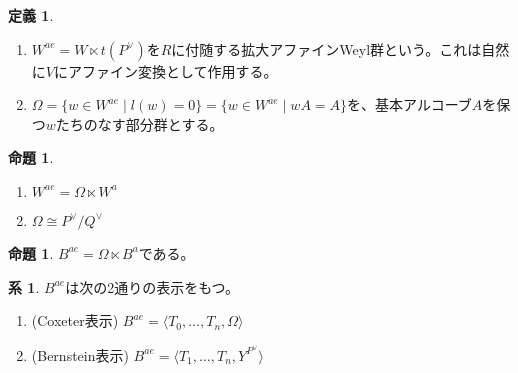 \documentclass[uplatex, a4paper, dvipdfmx]{jsarticle}
\theoremstyle{definition}
\newtheorem{definition}[theorem]{定義}
\newtheorem{proposition}[theorem]{命題}
\newtheorem{corollary}[theorem]{系}
\begin{document}
\begin{definition}
    \begin{enumerate}
        \item  $W^{ae} = W \ltimes t(P^\vee)$を$R$に付随する拡大アファインWeyl群という。これは自然に$V$にアファイン変換として作用する。
        \item $\Omega = \{w \in W^{ae} \mid l(w) = 0\} = \{w \in W^{ae} \mid wA = A\}$を、基本アルコーブ$A$を保つ$w$たちのなす部分群とする。
    \end{enumerate}
\end{definition}
\begin{proposition}
    \begin{enumerate}
        \item $W^{ae} = \Omega \ltimes W^a$
        \item $\Omega \cong P^\vee/Q^\vee$
    \end{enumerate}
\end{proposition}
\begin{proposition}
    $B^{ae} = \Omega \ltimes B^a$である。
\end{proposition}
\begin{corollary}
    $B^{ae}$は次の2通りの表示をもつ。
    \begin{enumerate}
        \item (Coxeter表示) $B^{ae} = \langle T_0, \dots, T_n, \Omega\rangle$
        \item (Bernstein表示) $B^{ae} = \langle T_1, \dots, T_n, Y^{P^\vee}\rangle$
    \end{enumerate}
\end{corollary}
\end{document}
